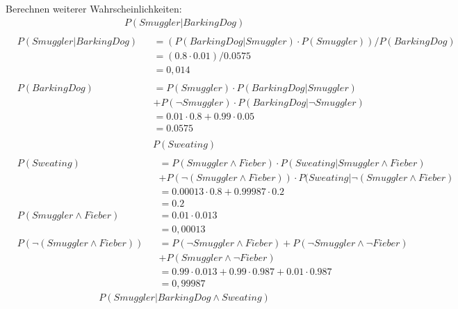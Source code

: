 \documentclass[ngerman]{fbi-aufgabenblatt}
\begin{document}
\newpage

Berechnen weiterer Wahrscheinlichkeiten:
\begin{align*}
&P(Smuggler | BarkingDog)\\
\end{align*}
\begin{align*}
&P(Smuggler | BarkingDog) &&= (P(BarkingDog | Smuggler) \cdot P(Smuggler)) / P(BarkingDog) \\
& &&= (0.8 \cdot 0.01) / 0.0575\\
& &&= 0,014\\
&\\
&P(BarkingDog) &&= P(Smuggler) \cdot P(BarkingDog | Smuggler) \\
& &&   + P( \neg Smuggler) \cdot P(BarkingDog | \neg Smuggler) \\
& &&= 0.01 \cdot 0.8 + 0.99 \cdot 0.05 \\
& &&= 0.0575 \\
\end{align*}
\begin{align*}
&P(Sweating)\\
\end{align*}
\begin{align*}
&P(Sweating) &&= P(Smuggler \land Fieber) \cdot  P(Sweating | Smuggler \land Fieber)\\
& && + P(\neg(Smuggler \land Fieber)) \cdot  P(Sweating | \neg(Smuggler \land Fieber)\\
& &&= 0.00013 \cdot 0.8 + 0.99987 \cdot 0.2 \\
& &&= 0.2 \\
&P(Smuggler \land Fieber) &&= 0.01 \cdot 0.013 \\
& &&= 0,00013\\
& P(\neg(Smuggler \land Fieber)) &&= P(\neg Smuggler \land Fieber) + P(\neg Smuggler \land \neg Fieber) \\
& &&+P(Smuggler \land \neg Fieber) \\
& &&= 0.99 \cdot 0.013 + 0.99 \cdot 0.987 + 0.01 \cdot 0.987 \\
& &&= 0,99987
\end{align*}
\begin{align*}
&P(Smuggler | BarkingDog \land Sweating)\\
\end{align*}
\end{document}
